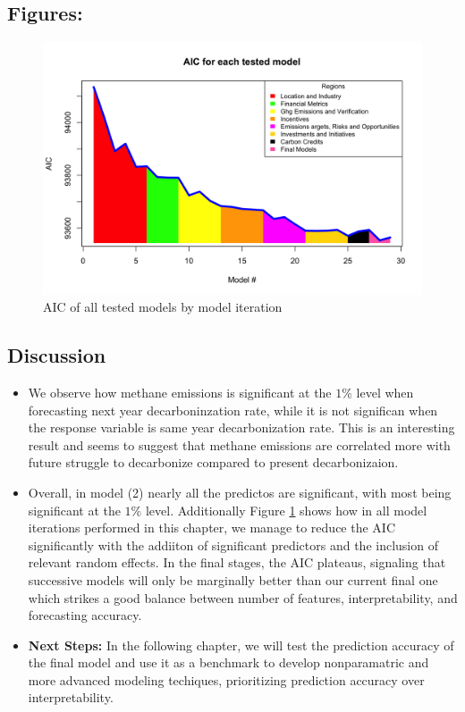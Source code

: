 

\subsection{Figures:}

\begin{figure}[H]
    \centering
    \includegraphics[width=\linewidth]{../notebooks/R/aic.png}
    \caption{AIC of all tested models by model iteration}
    \label{AIC}
\end{figure}

\subsection{Discussion}

\begin{itemize}
    \item We observe how methane emissions is significant at the $1\%$ level when forecasting next year decarboninzation rate, while it is not significan when the response variable is same year decarbonization rate. This is an interesting result and seems to suggest that methane emissions are correlated more with future struggle to decarbonize compared to present decarbonizaion. 
    \item Overall, in model (2) nearly all the predictos are significant, with most being significant at the $1\%$ level. Additionally Figure \ref{AIC} shows how in all model iterations performed in this chapter, we manage to reduce the AIC significantly with the addiiton of significant predictors and the inclusion of relevant random effects. In the final stages, the AIC plateaus, signaling that successive models will only be marginally better than our current final one which strikes a good balance between number of features, interpretability, and forecasting accuracy.
    \item \textbf{Next Steps:} In the following chapter, we will test the prediction accuracy of the final model and use it as a benchmark to develop nonparamatric and more advanced modeling techiques, prioritizing prediction accuracy over interpretability.
\end{itemize}